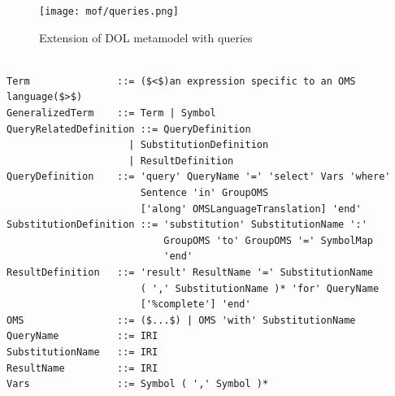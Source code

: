 \documentclass[10pt, a4paper]{isov2}
\begin{document}
\begin{figure}
    \centering
      \texttt{[image: mof/queries.png]}
     \caption{Extension of DOL metamodel with queries}
    \label{fig:queries} 
\end{figure}




\begin{lstlisting}[language=ebnf,escapeinside={()},mathescape]

Term               ::= ($<$)an expression specific to an OMS language($>$) 
GeneralizedTerm    ::= Term | Symbol
QueryRelatedDefinition ::= QueryDefinition
                     | SubstitutionDefinition
                     | ResultDefinition
QueryDefinition    ::= 'query' QueryName '=' 'select' Vars 'where'
                       Sentence 'in' GroupOMS
                       ['along' OMSLanguageTranslation] 'end'
SubstitutionDefinition ::= 'substitution' SubstitutionName ':'
                           GroupOMS 'to' GroupOMS '=' SymbolMap
                           'end'
ResultDefinition   ::= 'result' ResultName '=' SubstitutionName
                       ( ',' SubstitutionName )* 'for' QueryName
                       ['%complete'] 'end'
OMS                ::= ($...$) | OMS 'with' SubstitutionName 
QueryName          ::= IRI
SubstitutionName   ::= IRI
ResultName         ::= IRI
Vars               ::= Symbol ( ',' Symbol )*
\end{lstlisting}


\end{document}
